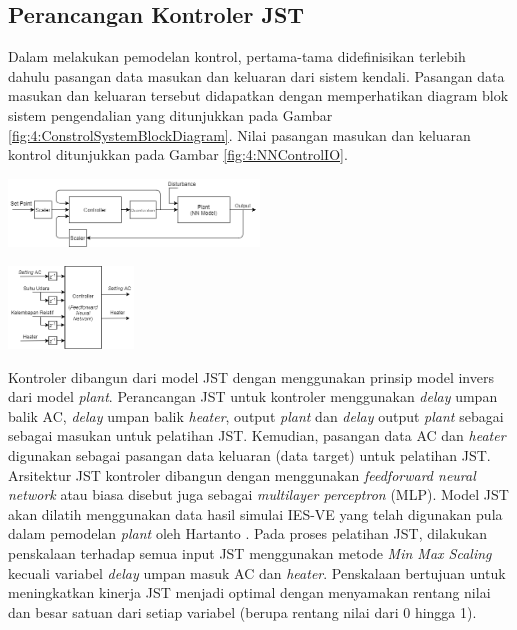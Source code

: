 \documentclass[a4paper,10pt]{article}
\makeatletter
\newenvironment{body}{\begin{multicols}{2}}{\end{multicols}}
\renewenvironment{figure}
{\def\@captype{figure}%
	\captionsetup{labelsep=period,format=hang,font=footnotesize,justification=justified}
}
{}
\makeatother
\begin{document}
\begin{body}
		\subsection{Perancangan Kontroler JST}
		
		Dalam melakukan pemodelan kontrol, pertama-tama didefinisikan terlebih dahulu pasangan data masukan dan keluaran dari sistem kendali. Pasangan data masukan dan keluaran tersebut didapatkan dengan memperhatikan diagram blok sistem pengendalian yang ditunjukkan pada Gambar \ref{fig:4:ConstrolSystemBlockDiagram}. Nilai pasangan masukan dan keluaran kontrol ditunjukkan pada Gambar \ref{fig:4:NNControlIO}.\\
		
		\begin{figure}
			\centering
			\includegraphics[width=0.5\textwidth]{figures/ControlDesignDiagramII}
			\caption{Diagram blok sistem kontrol berbasis JST\cite{paper42Paisan}}
			\label{fig:4:ConstrolSystemBlockDiagram}
		\end{figure}
	\vspace{1em}
		
		\begin{figure}
			\centering
			\includegraphics[width=0.25\textwidth]{figures/NNControllerIO}
			\caption{Pasangan masukan dan keluaran model JST kontroler}
			\label{fig:4:NNControlIO}
		\end{figure}
	
		Kontroler dibangun dari model JST dengan menggunakan prinsip model invers dari model \textit{plant}. Perancangan JST untuk kontroler menggunakan \textit{delay} umpan balik AC, \textit{delay} umpan balik \textit{heater}, output \textit{plant} dan \textit{delay} output \textit{plant} sebagai sebagai masukan untuk pelatihan JST. Kemudian, pasangan data AC dan \textit{heater} digunakan sebagai pasangan data keluaran (data target) untuk pelatihan JST. Arsitektur JST kontroler dibangun dengan menggunakan \textit{feedforward neural network} atau biasa disebut juga sebagai \textit{multilayer perceptron} (MLP). Model JST akan dilatih menggunakan data hasil simulai IES-VE yang telah digunakan pula dalam pemodelan \textit{plant} oleh Hartanto \cite{skripsiTanto}. Pada proses pelatihan JST, dilakukan penskalaan terhadap semua input JST menggunakan metode \textit{Min Max Scaling} kecuali variabel \textit{delay} umpan masuk AC dan \textit{heater}. Penskalaan bertujuan untuk meningkatkan kinerja JST menjadi optimal dengan menyamakan rentang nilai dan besar satuan dari setiap variabel (berupa rentang nilai dari 0 hingga 1).
		

\end{body}
\end{document}
